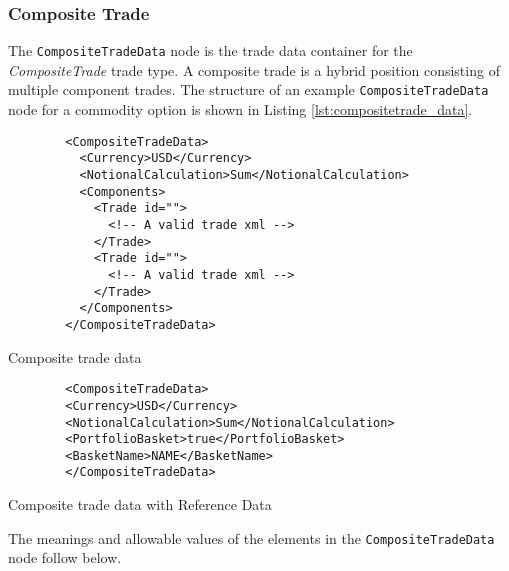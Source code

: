\subsubsection{Composite Trade}

The \lstinline!CompositeTradeData!  node is the trade data container for the  \emph{CompositeTrade} trade type.   A composite trade is a hybrid position consisting of multiple component trades. The structure of an example \lstinline!CompositeTradeData! node for a commodity option is shown in 
Listing \ref{lst:compositetrade_data}.

\begin{listing}[H]
	\begin{verbatim}
		<CompositeTradeData>
		  <Currency>USD</Currency>
		  <NotionalCalculation>Sum</NotionalCalculation>
		  <Components>
		    <Trade id="">
		      <!-- A valid trade xml -->
		    </Trade>
		    <Trade id="">
		      <!-- A valid trade xml -->
		    </Trade>
		  </Components>
		</CompositeTradeData>
	\end{verbatim}
	\caption{Composite trade data}
\end{listing}

\begin{listing}[H]
	\begin{verbatim}
		<CompositeTradeData>
		<Currency>USD</Currency>
		<NotionalCalculation>Sum</NotionalCalculation>
		<PortfolioBasket>true</PortfolioBasket>
		<BasketName>NAME</BasketName>
		</CompositeTradeData>
	\end{verbatim}
	\caption{Composite trade data with Reference Data}
	\label{lst:compositetrade_data_refdata}
\end{listing}

The meanings and allowable values of the elements in the \lstinline!CompositeTradeData!  node follow below.

